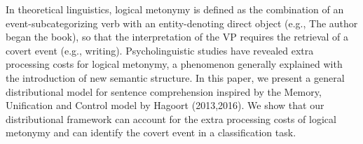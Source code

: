 In theoretical linguistics, logical metonymy is defined as the combination of an event-subcategorizing verb with an entity-denoting direct object (e.g., The author began the book), so that the interpretation of the VP requires the retrieval of a covert event (e.g., writing). Psycholinguistic studies have revealed extra processing costs for logical metonymy, a phenomenon generally explained with the introduction of new semantic structure. In this paper, we present a general distributional model for sentence comprehension inspired by the Memory, Unification and Control model by Hagoort (2013,2016). We show that our distributional framework can account for the extra processing costs of logical metonymy and can identify the covert event in a classification task.

